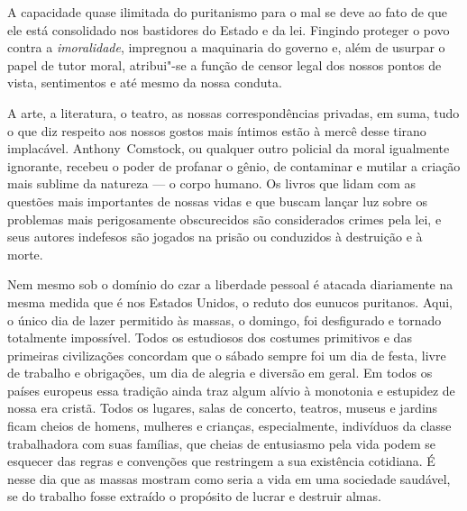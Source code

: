 A capacidade quase ilimitada do puritanismo para o mal se deve ao fato
de que ele está consolidado nos bastidores do Estado e da lei. Fingindo
proteger o povo contra a \textit{imoralidade}, impregnou a maquinaria do
governo e, além de usurpar o papel de tutor moral, atribui"-se a função de
censor legal dos nossos pontos de vista, sentimentos e até mesmo da
nossa conduta.

A arte, a literatura, o teatro, as nossas correspondências privadas, em
suma, tudo o que diz respeito aos nossos gostos mais íntimos estão à
mercê desse tirano implacável. Anthony~Comstock, ou qualquer outro
policial da moral igualmente ignorante, recebeu o poder de profanar o
gênio, de contaminar e mutilar a criação mais sublime da natureza --- o
corpo humano. Os livros que lidam com as questões mais importantes de
nossas vidas e que buscam lançar luz sobre os problemas mais
perigosamente obscurecidos são considerados crimes pela lei, e seus
autores indefesos são jogados na prisão ou conduzidos à destruição e à
morte.

Nem mesmo sob o domínio do czar a liberdade pessoal é atacada
diariamente na mesma medida que é nos Estados Unidos, o reduto dos
eunucos puritanos. Aqui, o único dia de lazer permitido às massas, o
domingo, foi desfigurado e tornado totalmente impossível. Todos os
estudiosos dos costumes primitivos e das primeiras civilizações
concordam que o sábado sempre foi um dia de festa, livre de trabalho e
obrigações, um dia de alegria e diversão em geral. Em todos os países
europeus essa tradição ainda traz algum alívio à monotonia e estupidez
de nossa era cristã. Todos os lugares, salas de concerto, teatros, 
museus e jardins ficam cheios de homens, mulheres e crianças,
especialmente, indivíduos da classe trabalhadora com suas famílias, que
cheias de entusiasmo pela vida podem se esquecer das regras e convenções
que restringem a sua existência cotidiana. É nesse dia que as massas
mostram como seria a vida em uma sociedade saudável, se do trabalho
fosse extraído o propósito de lucrar e destruir almas.

